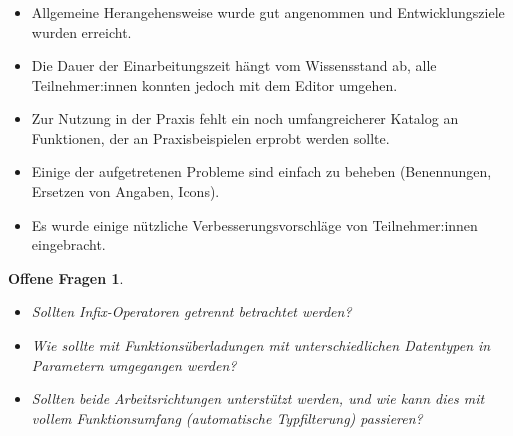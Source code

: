 \begin{frame}
  \frametitle{\currentsectionname}

  \begin{itemize}
    \item Allgemeine Herangehensweise wurde gut angenommen und Entwicklungsziele wurden erreicht.
    \item Die Dauer der Einarbeitungszeit hängt vom Wissensstand ab, alle Teilnehmer:innen konnten jedoch mit dem Editor umgehen.
    \item Zur Nutzung in der Praxis fehlt ein noch umfangreicherer Katalog an Funktionen, der an Praxisbeispielen erprobt werden sollte.
    \item Einige der aufgetretenen Probleme sind einfach zu beheben (Benennungen, Ersetzen von Angaben, Icons).
    \item Es wurde einige nützliche Verbesserungsvorschläge von Teilnehmer:innen eingebracht.
  \end{itemize}

\end{frame}

\begin{frame}
  \newtheorem{qs}{Offene Fragen}
  \begin{qs}
    \begin{itemize}
      \item Sollten Infix-Operatoren getrennt betrachtet werden?
      \item Wie sollte mit Funktionsüberladungen mit unterschiedlichen Datentypen in Parametern umgegangen werden?
      \item Sollten beide Arbeitsrichtungen unterstützt werden, und wie kann dies mit vollem Funktionsumfang (automatische Typfilterung) passieren?
    \end{itemize}
  \end{qs}

\end{frame}
